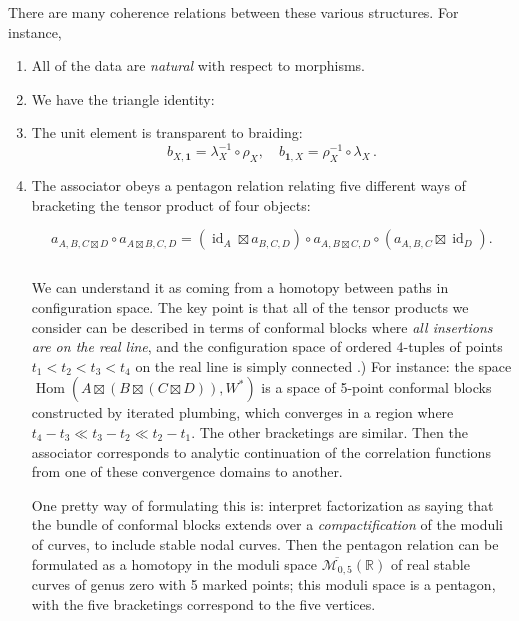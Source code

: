 \documentclass[12pt,letterpaper,reqno]{amsart}
\numberwithin{equation}{section}
\newcommand{\cM}{\ensuremath{\mathcal M}}
\newcommand{\bbR}{\ensuremath{\mathbb R}}
\newcommand\bid{{\mathbf 1}}
\newcommand{\ti}[1]{\textit{#1}}
\DeclareMathOperator{\Hom}{Hom}
\DeclareMathOperator{\id}{id}
\DeclareRobustCommand{\fixme}[1]{\leavevmode{\color{orange}[#1]}}
\begin{document}
There are many coherence relations between these various structures.
For instance,
\begin{enumerate}

\item All of the data are \ti{natural} with respect to morphisms.

\item We have the triangle identity:
\[

\]

\item The unit element is transparent to braiding:
\begin{equation}
  b_{X,\bid} = \lambda_X^{-1} \circ \rho_X, \quad b_{\bid,X} = \rho_X^{-1} \circ \lambda_X \, .
\end{equation}

\item The associator obeys a pentagon relation relating five different ways of
bracketing the tensor product of four objects:


\[
a_{A,B,C\boxtimes D}\circ a_{A\boxtimes B,C,D}
=
(\id_A\boxtimes a_{B,C,D})\circ a_{A,B\boxtimes C,D}\circ (a_{A,B,C}\boxtimes \id_D).
\]

\[

\]

We can understand it as coming from a homotopy between paths in configuration space.
The key point is that all of the tensor products we consider can be described in terms of 
conformal blocks where \ti{all insertions are on the real line}, and 
the configuration space of ordered $4$-tuples of points $t_1 < t_2 < t_3 < t_4$ on the real line is simply connected \fixme{draw figure}.)
For instance: the space $\Hom(A \boxtimes (B \boxtimes (C \boxtimes D)), W^*)$ is a space of 5-point conformal blocks
constructed by iterated plumbing, which converges in a region 
where $t_4 - t_3 \ll t_3 - t_2 \ll t_2 - t_1$. 
The other bracketings are similar. Then the associator corresponds to analytic continuation of the correlation functions
from one of these convergence domains to another.

One pretty way of formulating this is: interpret factorization as 
saying that the bundle of conformal blocks extends over a
\ti{compactification} of the moduli of curves, to include 
stable nodal curves. Then the pentagon relation can be formulated
as a homotopy in the moduli space $\overline{\cM_{0,5}}(\bbR)$ of 
real stable curves of genus zero with 5 marked points;
this moduli space is a pentagon, with the 
five bracketings correspond to the five vertices.


\end{enumerate}
\end{document}
